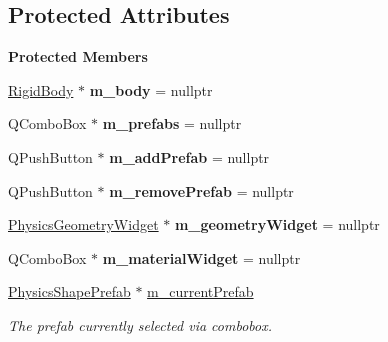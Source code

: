 \subsection*{Protected Attributes}
\begin{Indent}\textbf{ Protected Members}\par
\begin{DoxyCompactItemize}
\item 
\mbox{\label{classrev_1_1_view_1_1_physics_shape_widget_a1eb52f74993102f9202c2ab94b7c21d2}} 
\mbox{\hyperlink{classrev_1_1_rigid_body}{Rigid\+Body}} $\ast$ {\bfseries m\+\_\+body} = nullptr
\item 
\mbox{\label{classrev_1_1_view_1_1_physics_shape_widget_a47bbe1c71516593a0f3827cd6026d702}} 
Q\+Combo\+Box $\ast$ {\bfseries m\+\_\+prefabs} = nullptr
\item 
\mbox{\label{classrev_1_1_view_1_1_physics_shape_widget_a2a4b4ab6927208cba53cc4f5f8de595f}} 
Q\+Push\+Button $\ast$ {\bfseries m\+\_\+add\+Prefab} = nullptr
\item 
\mbox{\label{classrev_1_1_view_1_1_physics_shape_widget_a9990e3e009c7252f911aa296778ee39b}} 
Q\+Push\+Button $\ast$ {\bfseries m\+\_\+remove\+Prefab} = nullptr
\item 
\mbox{\label{classrev_1_1_view_1_1_physics_shape_widget_a1418339f2de6bf7f6ff8049b78def751}} 
\mbox{\hyperlink{classrev_1_1_view_1_1_physics_geometry_widget}{Physics\+Geometry\+Widget}} $\ast$ {\bfseries m\+\_\+geometry\+Widget} = nullptr
\item 
\mbox{\label{classrev_1_1_view_1_1_physics_shape_widget_a0d5dfd35e24a6e8c55e1235a897794a7}} 
Q\+Combo\+Box $\ast$ {\bfseries m\+\_\+material\+Widget} = nullptr
\item 
\mbox{\label{classrev_1_1_view_1_1_physics_shape_widget_a57f0def56ffcf721d540f61bfa2ee96b}} 
\mbox{\hyperlink{classrev_1_1_physics_shape_prefab}{Physics\+Shape\+Prefab}} $\ast$ \mbox{\hyperlink{classrev_1_1_view_1_1_physics_shape_widget_a57f0def56ffcf721d540f61bfa2ee96b}{m\+\_\+current\+Prefab}}
\begin{DoxyCompactList}\small\item\em The prefab currently selected via combobox. \end{DoxyCompactList}\end{DoxyCompactItemize}
\end{Indent}

